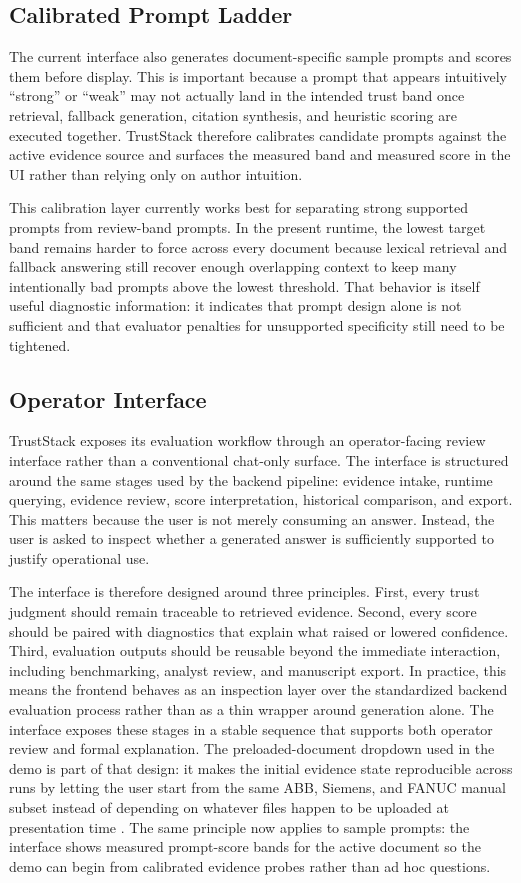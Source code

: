 \documentclass[conference]{IEEEtran}
\newcommand{\TrustSubsection}[1]{\subsection{\texorpdfstring{\textcolor{TrustStackTeal}{#1}}{#1}}}
\begin{document}
\TrustSubsection{Calibrated Prompt Ladder}
The current interface also generates document-specific sample prompts and scores them before display. This is important because a prompt that appears intuitively ``strong'' or ``weak'' may not actually land in the intended trust band once retrieval, fallback generation, citation synthesis, and heuristic scoring are executed together. TrustStack therefore calibrates candidate prompts against the active evidence source and surfaces the measured band and measured score in the UI rather than relying only on author intuition.

This calibration layer currently works best for separating strong supported prompts from review-band prompts. In the present runtime, the lowest target band remains harder to force across every document because lexical retrieval and fallback answering still recover enough overlapping context to keep many intentionally bad prompts above the lowest threshold. That behavior is itself useful diagnostic information: it indicates that prompt design alone is not sufficient and that evaluator penalties for unsupported specificity still need to be tightened.

\TrustSubsection{Operator Interface}
TrustStack exposes its evaluation workflow through an operator-facing review interface rather than a conventional chat-only surface. The interface is structured around the same stages used by the backend pipeline: evidence intake, runtime querying, evidence review, score interpretation, historical comparison, and export. This matters because the user is not merely consuming an answer. Instead, the user is asked to inspect whether a generated answer is sufficiently supported to justify operational use.

The interface is therefore designed around three principles. First, every trust judgment should remain traceable to retrieved evidence. Second, every score should be paired with diagnostics that explain what raised or lowered confidence. Third, evaluation outputs should be reusable beyond the immediate interaction, including benchmarking, analyst review, and manuscript export. In practice, this means the frontend behaves as an inspection layer over the standardized backend evaluation process rather than as a thin wrapper around generation alone. The interface exposes these stages in a stable sequence that supports both operator review and formal explanation. The preloaded-document dropdown used in the demo is part of that design: it makes the initial evidence state reproducible across runs by letting the user start from the same ABB, Siemens, and FANUC manual subset instead of depending on whatever files happen to be uploaded at presentation time \cite{singh2025technicalmanuals}. The same principle now applies to sample prompts: the interface shows measured prompt-score bands for the active document so the demo can begin from calibrated evidence probes rather than ad hoc questions.
\end{document}
